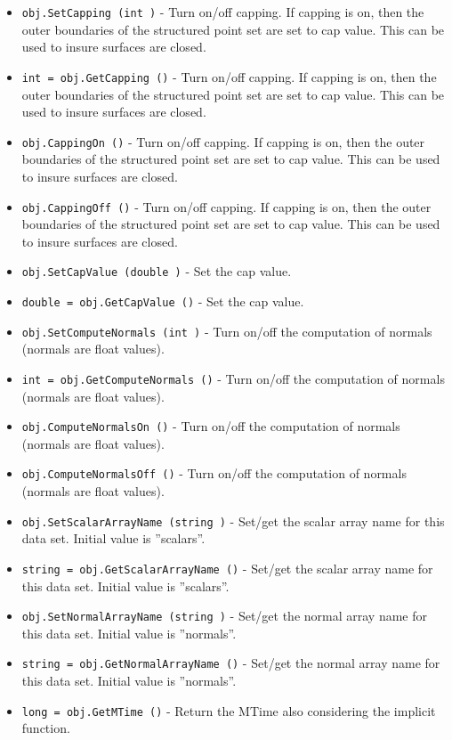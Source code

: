 \begin{itemize}
\item  \verb|obj.SetCapping (int )| -  Turn on/off capping. If capping is on, then the outer boundaries of the
 structured point set are set to cap value. This can be used to insure
 surfaces are closed.

\item  \verb|int = obj.GetCapping ()| -  Turn on/off capping. If capping is on, then the outer boundaries of the
 structured point set are set to cap value. This can be used to insure
 surfaces are closed.

\item  \verb|obj.CappingOn ()| -  Turn on/off capping. If capping is on, then the outer boundaries of the
 structured point set are set to cap value. This can be used to insure
 surfaces are closed.

\item  \verb|obj.CappingOff ()| -  Turn on/off capping. If capping is on, then the outer boundaries of the
 structured point set are set to cap value. This can be used to insure
 surfaces are closed.

\item  \verb|obj.SetCapValue (double )| -  Set the cap value.

\item  \verb|double = obj.GetCapValue ()| -  Set the cap value.

\item  \verb|obj.SetComputeNormals (int )| -  Turn on/off the computation of normals (normals are float values).

\item  \verb|int = obj.GetComputeNormals ()| -  Turn on/off the computation of normals (normals are float values).

\item  \verb|obj.ComputeNormalsOn ()| -  Turn on/off the computation of normals (normals are float values).

\item  \verb|obj.ComputeNormalsOff ()| -  Turn on/off the computation of normals (normals are float values).

\item  \verb|obj.SetScalarArrayName (string )| -  Set/get the scalar array name for this data set. Initial value is
 ''scalars''.

\item  \verb|string = obj.GetScalarArrayName ()| -  Set/get the scalar array name for this data set. Initial value is
 ''scalars''.

\item  \verb|obj.SetNormalArrayName (string )| -  Set/get the normal array name for this data set. Initial value is
 ''normals''.

\item  \verb|string = obj.GetNormalArrayName ()| -  Set/get the normal array name for this data set. Initial value is
 ''normals''.

\item  \verb|long = obj.GetMTime ()| -  Return the MTime also considering the implicit function.

\end{itemize}
